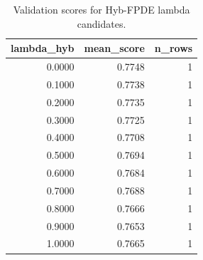 \begin{table}[t]
\caption{Validation scores for Hyb-FPDE lambda candidates.}
\label{tab:lambda_distribution_computed}
\centering
\begin{tabular}{rrr}
\toprule
lambda\_hyb & mean\_score & n\_rows \\
\midrule
0.0000 & 0.7748 & 1 \\
0.1000 & 0.7738 & 1 \\
0.2000 & 0.7735 & 1 \\
0.3000 & 0.7725 & 1 \\
0.4000 & 0.7708 & 1 \\
0.5000 & 0.7694 & 1 \\
0.6000 & 0.7684 & 1 \\
0.7000 & 0.7688 & 1 \\
0.8000 & 0.7666 & 1 \\
0.9000 & 0.7653 & 1 \\
1.0000 & 0.7665 & 1 \\
\bottomrule
\end{tabular}

\end{table}
